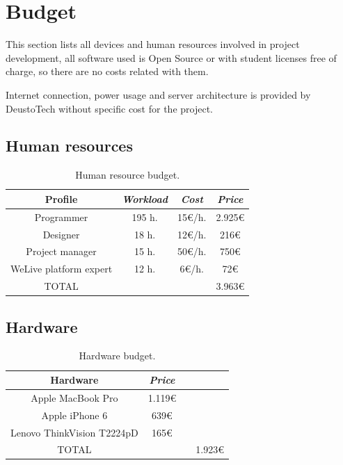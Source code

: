 \documentclass{DeustoFDP}
\begin{document}
\chapter{Budget}\label{cha:budget}
This section lists all devices and human resources involved in project development, all software used is Open Source or with student licenses free of charge, so there are no costs related with them.

Internet connection, power usage and server architecture is provided by DeustoTech without specific cost for the project.

\section{Human resources}
\begin{table}[H]
	\centering
	\caption{Human resource budget.}\label{tab:budgetprofile}
	\begin{tabular}{cccc}
		\toprule
		\textbf{Profile} & \emph{Workload} & \emph{Cost} & \emph{Price}\\
		\midrule
		Programmer  & 195 h.     & 15€/h. & 2.925€ \\
		Designer   & 18 h.     & 12€/h. & 216€ \\
		Project manager & 15 h.     & 50€/h.  & 750€ \\
		WeLive platform expert & 12 h.     & 6€/h. & 72€ \\
		TOTAL & & & 3.963€\\
		\bottomrule
	\end{tabular}
\end{table}

\section{Hardware}
\begin{table}[H]
	\centering
	\caption{Hardware budget.}\label{tab:budgethardware}
	\begin{tabular}{cccc}
		\toprule
		\textbf{Hardware} & \emph{Price}\\
		\midrule
		Apple MacBook Pro  & 1.119€ \\
		Apple iPhone 6 & 639€ \\
		Lenovo ThinkVision T2224pD & 165€ \\
		
		TOTAL & & & 1.923€\\
		\bottomrule
	\end{tabular}
\end{table}
\end{document}
